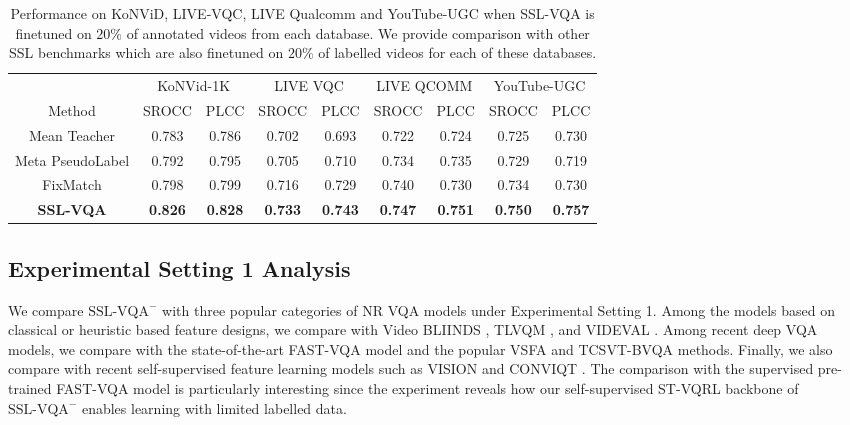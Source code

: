 \documentclass[10pt,twocolumn,letterpaper]{article}
\begin{document}
\begin{table}
\centering
\begin{tabular}{c|cc|cc|cc|cc}
\hline
                 & \multicolumn{2}{c|}{KoNVid-1K} & \multicolumn{2}{c|}{LIVE VQC} & \multicolumn{2}{c|}{LIVE QCOMM} & \multicolumn{2}{c}{YouTube-UGC} \\ \cline{2-9} 
Method           & SROCC          & PLCC          & SROCC         & PLCC          & SROCC          & PLCC           & SROCC          & PLCC           \\ \hline
Mean Teacher     & 0.783          & 0.786         & 0.702         & 0.693         & 0.722          & 0.724          & 0.725          & 0.730          \\
Meta PseudoLabel & 0.792          & 0.795         & 0.705         & 0.710         & 0.734          & 0.735          & 0.729          & 0.719               \\
FixMatch         & 0.798          & 0.799         & 0.716         & 0.729         & 0.740          & 0.730          & 0.734          & 0.730          \\ \hline
\textbf{SSL-VQA}             & \textbf{0.826}          & \textbf{0.828}         & \textbf{0.733}         & \textbf{0.743}         & \textbf{0.747}          & \textbf{0.751}          & \textbf{0.750}          & \textbf{0.757}          \\ \hline
\end{tabular}
\caption{Performance on KoNViD, LIVE-VQC, LIVE Qualcomm and YouTube-UGC when SSL-VQA is finetuned on $20\%$ of annotated videos from each database. We provide comparison with other SSL benchmarks which are also finetuned on $20\%$ of labelled videos for each of these databases.}
\label{finetune}
\end{table}

\subsection{Experimental Setting 1 Analysis}
We compare $\textrm{SSL-VQA}^{-}$ with three popular categories of NR VQA models under Experimental Setting 1. Among the models based on classical or heuristic based feature designs, we compare with Video BLIINDS \cite{vbliind}, TLVQM \cite{tlvqm}, and VIDEVAL \cite{videval}. Among recent deep VQA models, we compare with the state-of-the-art FAST-VQA model \cite{fastVQA} and the popular VSFA \cite{qa_in_the_wild} and TCSVT-BVQA \cite{csvt_bvqa} methods. Finally, we also compare with recent self-supervised feature learning models such as VISION \cite{vision} and CONVIQT \cite{CONVIQT}. The comparison with the supervised pre-trained FAST-VQA model is particularly interesting since the experiment reveals how our self-supervised ST-VQRL backbone of $\textrm{SSL-VQA}^{-}$ enables learning with limited labelled data. 
\end{document}
